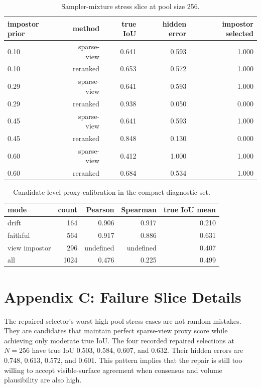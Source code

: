 \documentclass{article}
\begin{document}
\begin{table}[t]
\centering
\caption{Sampler-mixture stress slice at pool size 256.}
\label{tab:mixture}
\begin{tabular}{lrrrr}
\toprule
impostor prior & method & true IoU & hidden error & impostor selected \\
\midrule
0.10 & sparse-view & 0.641 & 0.593 & 1.000 \\
0.10 & reranked & 0.653 & 0.572 & 1.000 \\
0.29 & sparse-view & 0.641 & 0.593 & 1.000 \\
0.29 & reranked & 0.938 & 0.050 & 0.000 \\
0.45 & sparse-view & 0.641 & 0.593 & 1.000 \\
0.45 & reranked & 0.848 & 0.130 & 0.000 \\
0.60 & sparse-view & 0.412 & 1.000 & 1.000 \\
0.60 & reranked & 0.684 & 0.534 & 1.000 \\
\bottomrule
\end{tabular}
\end{table}

\begin{table}[t]
\centering
\caption{Candidate-level proxy calibration in the compact diagnostic set.}
\label{tab:calibration}
\begin{tabular}{lrrrr}
\toprule
mode & count & Pearson & Spearman & true IoU mean \\
\midrule
drift & 164 & 0.906 & 0.917 & 0.210 \\
faithful & 564 & 0.917 & 0.886 & 0.631 \\
view impostor & 296 & undefined & undefined & 0.407 \\
all & 1024 & 0.476 & 0.225 & 0.499 \\
\bottomrule
\end{tabular}
\end{table}

\section{Appendix C: Failure Slice Details}

The repaired selector's worst high-pool stress cases are not random mistakes.
They are candidates that maintain perfect sparse-view proxy score while
achieving only moderate true IoU. The four recorded repaired selections at
$N=256$ have true IoU 0.503, 0.584, 0.607, and 0.632. Their hidden errors are
0.748, 0.613, 0.572, and 0.601. This pattern implies that the repair is still
too willing to accept visible-surface agreement when consensus and volume
plausibility are also high.
\end{document}
